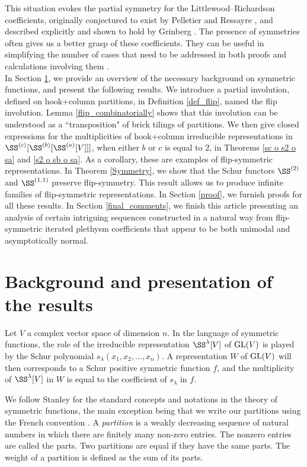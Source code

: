 \documentclass[twoside]{article}
\begin{document}
This situation evokes  the partial symmetry for the Littlewood--Richardson coefficients, originally conjectured to exist by Pelletier and Ressayre \cite{pelletier}, and described explicitly and shown to hold by Grinberg \cite{grinberg}.
The presence of symmetries often gives us a better grasp of these coefficients. They can be useful in simplifying the number of cases that need to be addressed in both proofs and calculations involving them \cite{briand15}.\\

In Section \ref{sec:results}, we provide an overview of the necessary background on symmetric functions, and present the following results.
We introduce a partial involution, defined on hook+column partitions, in Definition \ref{def_flip}, named the flip involution.  Lemma \ref{flip_combinatorially}  shows that this involution can be understood as a ``transposition" of brick tilings of partitions. We then give closed expressions for the multiplicities of hook+column irreducible representations in  $\SS^{(c)}[\SS^{(b)}[\SS^{ (a)}[V]]]$, when either $b$ or $c$ is equal to 2, in Theorems \ref{sc o s2 o sa} and \ref{s2 o sb o sa}. As a corollary, these are examples of flip-symmetric representations.
In Theorem \ref{Symmetry},  we show that the Schur functors $\SS^{(2)}$ and $\SS^{(1,1)}$ preserve flip-symmetry. 
This result  allows us to produce  infinite families of flip-symmetric representations. In Section \ref{proof}, we furnish proofs for all these results.
In Section \ref{final_comments}, we finish this article presenting  an analysis of certain intriguing sequences constructed in a natural way from flip-symmetric iterated plethysm coefficients that appear to be both unimodal and asymptotically normal. 

\section{Background and presentation of the results}\label{sec:results}

Let $V$ a complex vector space of dimension $n.$
 In the language of symmetric functions, the role of the irreducible representation $\SS^{\lambda}[V]$ of $\textnormal{GL}(V)$ is played by
  the Schur polynomial $s_\lambda(x_1, x_2, \ldots, x_n).$
  A representation $W$ of $\textnormal{GL}(V)$  will then corresponds to a Schur positive
  symmetric function $f$, and the multiplicity of $\SS^{\lambda}[V]$
  in $W$ is equal to the coefficient of $s_\lambda$ in $f$.

We follow Stanley \cite{stanleyEC2} for the standard concepts and notations in the theory of symmetric functions, the main exception being that we write our partitions using the French convention \cite{macdonald}.
A \emph{partition} is a weakly decreasing sequence of natural numbers in which there are finitely many non-zero entries. The nonzero entries  are called the parts. Two partitions
are equal if they have the same parts. The weight of a partition is defined as the
sum of its parts.
\end{document}
